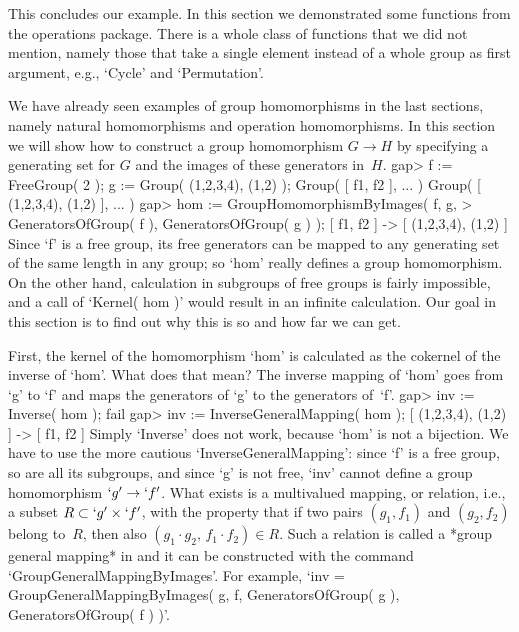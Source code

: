 This  concludes  our  example.   In  this  section  we demonstrated  some
functions  from  the operations  package.   There  is  a  whole class  of
functions that  we  did  not mention, namely  those that  take  a  single
element instead  of a  whole  group  as first argument, e.g., `Cycle' and
`Permutation'.


We  have already    seen examples of  group  homomorphisms   in the  last
sections, namely  natural homomorphisms and  operation homomorphisms.  In
this section we will show how to construct  a group homomorphism $G\to H$
by specifying a generating set for $G$ and the images of these generators
in~$H$.
\beginexample
    gap> f := FreeGroup( 2 ); g := Group( (1,2,3,4), (1,2) );
    Group( [ f1, f2 ], ... )
    Group( [ (1,2,3,4), (1,2) ], ... )
    gap> hom := GroupHomomorphismByImages( f, g,
    >           GeneratorsOfGroup( f ), GeneratorsOfGroup( g ) );
    [ f1, f2 ] -> [ (1,2,3,4), (1,2) ]
\endexample
Since `f'  is a  free  group, its free  generators  can be mapped  to any
generating set of the same length in any group; so `hom' really defines a
group homomorphism.  On the other  hand, calculation in subgroups of free
groups is fairly impossible, and  a call of  `Kernel( hom )' would result
in an infinite calculation. Our goal  in this section is  to find out why
this is so and how far we can get.

First, the kernel of the homomorphism `hom' is calculated as the cokernel
of the inverse  of `hom'. What   does that mean?  The inverse  mapping of
`hom' goes from  `g'  to  `f' and  maps  the  generators  of `g'   to the
generators of~`f'.
\beginexample
    gap> inv := Inverse( hom );
    fail
    gap> inv := InverseGeneralMapping( hom );
    [ (1,2,3,4), (1,2) ] -> [ f1, f2 ]
\endexample
Simply `Inverse' does not work, because `hom' is not a bijection. We have
to use the more cautious   `InverseGeneralMapping': since `f' is a   free
group, so are all its subgroups, and since  `g' is not free, `inv' cannot
define a group homomorphism  $`g' \to `f'$.  What exists is a multivalued
mapping, or relation, i.e., a subset $R\subset  `g' \times `f'$, with the
property that  if  two pairs $(g_1,f_1)$  and $(g_2,f_2)$  belong to~$R$,
then also $(g_1\cdot g_2,\,f_1\cdot f_2)\in R$. Such a relation is called
a *group general mapping* in  {\GAP} and it  can be constructed with  the
command    `GroupGeneralMappingByImages'.     For   example,   `inv     =
GroupGeneralMappingByImages(    g,      f,    GeneratorsOfGroup(   g   ),
GeneratorsOfGroup( f ) )'.

